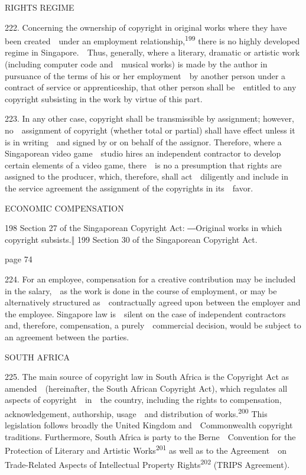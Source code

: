 \documentclass[
]{article}
\begin{document}
{RIGHTS REGIME}

{222. }{Concerning the ownership of copyright in original works where
they have been created~~under an employment
relationship,}\textsuperscript{{199 }}{there is no highly developed
regime in Singapore.~~Thus, generally, where a literary, dramatic or
artistic work (including computer code and~~musical works) is made by
the author in pursuance of the terms of his or her employment~~by
another person under a contract of service or apprenticeship, that other
person shall be~~entitled to any copyright subsisting in the work by
virtue of this part.}

{223. }{In any other case, copyright shall be transmissible by
assignment; however, no~~assignment of copyright (whether total or
partial) shall have effect unless it is in writing~~and signed by or on
behalf of the assignor. Therefore, where a Singaporean video
game~~studio hires an independent contractor to develop certain elements
of a video game, there~~is no a presumption that rights are assigned to
the producer, which, therefore, shall act~~diligently and include in the
service agreement the assignment of the copyrights in its~~favor.}

{ECONOMIC COMPENSATION}

{198 }{Section 27 of the Singaporean }{Copyright Act}{: }{―}{Original
works in which copyright subsists.}{‖ }{199 }{Section 30 of the
Singaporean }{Copyright Act}{.}

{page 74}

{224. }{For an employee, compensation for a creative contribution may be
included in the salary,~~as the work is done in the course of
employment, or may be alternatively structured as~~contractually agreed
upon between the employer and the employee. Singapore law is~~silent on
the case of independent contractors and, therefore, compensation, a
purely~~commercial decision, would be subject to an agreement between
the parties.}

{SOUTH AFRICA}

{225. }{The main source of copyright law in South Africa is the
}{Copyright Act }{as amended~~(hereinafter, the South African
}{Copyright Act}{), which regulates all aspects of copyright~~in~~the
country, including the rights to compensation, acknowledgement,
authorship, usage~~and distribution of works.}\textsuperscript{{200
}}{This legislation follows broadly the United Kingdom and~~Commonwealth
copyright traditions. Furthermore, South Africa is party to the
}{Berne~~Convention for the Protection of Literary and Artistic
Works}\textsuperscript{{201 }}{as well as to the }{Agreement~~on
Trade-Related Aspects of Intellectual Property
Rights}\textsuperscript{{202 }}{(TRIPS Agreement).}
\end{document}
